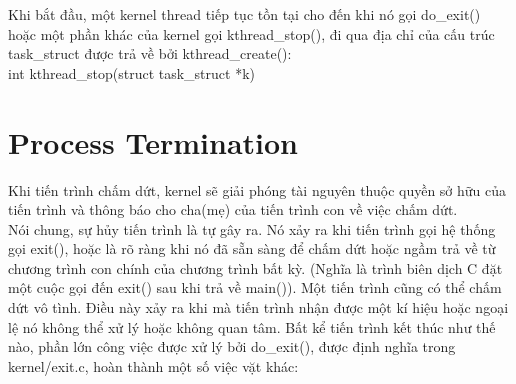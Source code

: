 \documentclass[a4paper,10pt]{report}
\begin{document}
Khi bắt đầu, một kernel thread tiếp tục tồn tại cho đến khi nó gọi do\_exit() hoặc một phần khác của kernel gọi kthread\_stop(), đi qua địa chỉ của cấu trúc task\_struct được trả về bởi kthread\_create(): \\
int kthread\_stop(struct task\_struct *k)
\section{Process Termination}
Khi tiến trình chấm dứt, kernel sẽ giải phóng tài nguyên thuộc quyền sở hữu của tiến trình và thông báo cho cha(mẹ) của tiến trình con về việc chấm dứt. \\

Nói chung, sự hủy tiến trình là tự gây ra. Nó xảy ra khi tiến trình gọi hệ thống gọi exit(), hoặc là rõ ràng khi nó đã sẵn sàng để chấm dứt hoặc ngầm trả về từ chương trình con chính của chương trình bất kỳ. (Nghĩa là trình biên dịch C đặt một cuộc gọi đến exit() sau khi trả về main()). Một tiến trình cũng có thể chấm dứt vô tình. Điều này xảy ra khi mà tiến trình nhận được một kí hiệu hoặc ngoại lệ nó không thể xử lý hoặc không quan tâm. Bất kể tiến trình kết thúc như thế nào, phần lớn công việc được xử lý bởi do\_exit(), được định nghĩa trong kernel/exit.c, hoàn thành một số việc vặt khác:
\end{document}
